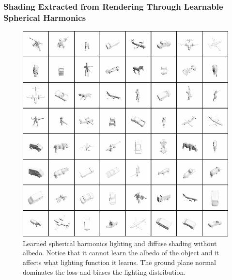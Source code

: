 \documentclass[10pt,twocolumn,letterpaper]{article}
\begin{document}
\subsubsection{Shading Extracted from Rendering Through Learnable Spherical Harmonics}\label{sec:learned_sh}
\begin{figure}[h!]
\centering
\includegraphics[trim={0 0 392px 687px},clip,width=1.0\columnwidth]{./assets/SH_LitTrainingData.jpg}
\caption{Learned spherical harmonics lighting and diffuse shading without albedo.  Notice that it cannot learn the albedo of the object and it affects what lighting function it learns.  The ground plane normal dominates the loss and biases the lighting distribution.}
\label{fig:SH_ONLY}
\end{figure}
\end{document}

